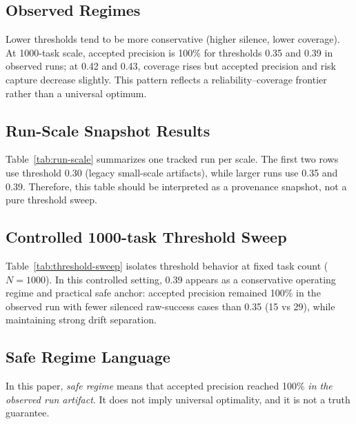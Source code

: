 \documentclass[11pt]{article}
\begin{document}
\subsection{Observed Regimes}
Lower thresholds tend to be more conservative (higher silence, lower coverage). At 1000-task scale, accepted precision is 100\% for thresholds 0.35 and 0.39 in observed runs; at 0.42 and 0.43, coverage rises but accepted precision and risk capture decrease slightly. This pattern reflects a reliability--coverage frontier rather than a universal optimum.

\subsection{Run-Scale Snapshot Results}
Table~\ref{tab:run-scale} summarizes one tracked run per scale. The first two rows use threshold 0.30 (legacy small-scale artifacts), while larger runs use 0.35 and 0.39. Therefore, this table should be interpreted as a provenance snapshot, not a pure threshold sweep.

\begin{table}[H]
\centering
\caption{Run-scale snapshot generated from \texttt{paper/figures/results\_by\_run\_scale.csv}.}
\label{tab:run-scale}

\end{table}

\subsection{Controlled 1000-task Threshold Sweep}
Table~\ref{tab:threshold-sweep} isolates threshold behavior at fixed task count (\(N=1000\)). In this controlled setting, 0.39 appears as a conservative operating regime and practical safe anchor: accepted precision remained 100\% in the observed run with fewer silenced raw-success cases than 0.35 (15 vs 29), while maintaining strong drift separation.

\begin{table}[H]
\centering
\caption{1000-task threshold sweep generated from \texttt{paper/figures/results\_1000\_threshold\_sweep.csv}.}
\label{tab:threshold-sweep}

\end{table}

\subsection{Safe Regime Language}
In this paper, \emph{safe regime} means that accepted precision reached 100\% \emph{in the observed run artifact}. It does not imply universal optimality, and it is not a truth guarantee.
\end{document}
